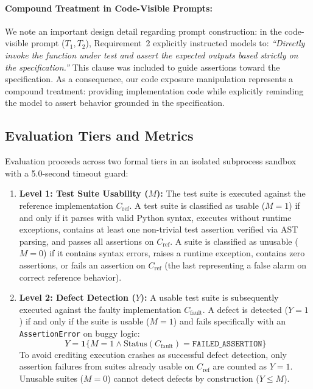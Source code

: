 \documentclass[11pt,a4paper]{article}
\begin{document}
\paragraph{Compound Treatment in Code-Visible Prompts:}
We note an important design detail regarding prompt construction: in the code-visible prompt ($T_1, T_2$), Requirement~2 explicitly instructed models to: \textit{``Directly invoke the function under test and assert the expected outputs based strictly on the specification.''} This clause was included to guide assertions toward the specification. As a consequence, our code exposure manipulation represents a compound treatment: providing implementation code while explicitly reminding the model to assert behavior grounded in the specification.

\subsection{Evaluation Tiers and Metrics}
Evaluation proceeds across two formal tiers in an isolated subprocess sandbox with a 5.0-second timeout guard:
\begin{enumerate}
    \item \textbf{Level 1: Test Suite Usability ($M$):} The test suite is executed against the reference implementation $C_{\text{ref}}$. A test suite is classified as usable ($M=1$) if and only if it parses with valid Python syntax, executes without runtime exceptions, contains at least one non-trivial test assertion verified via AST parsing, and passes all assertions on $C_{\text{ref}}$. A suite is classified as unusable ($M = 0$) if it contains syntax errors, raises a runtime exception, contains zero assertions, or fails an assertion on $C_{\text{ref}}$ (the last representing a false alarm on correct reference behavior).
    \item \textbf{Level 2: Defect Detection ($Y$):} A usable test suite is subsequently executed against the faulty implementation $C_{\text{fault}}$. A defect is detected ($Y=1$) if and only if the suite is usable ($M=1$) and fails specifically with an \texttt{AssertionError} on buggy logic:
    \begin{equation}
        Y = \mathbf{1}\{M=1 \land \text{Status}(C_{\text{fault}}) = \texttt{FAILED\_ASSERTION}\}
    \end{equation}
    To avoid crediting execution crashes as successful defect detection, only assertion failures from suites already usable on $C_{\text{ref}}$ are counted as $Y=1$. Unusable suites ($M=0$) cannot detect defects by construction ($Y \le M$).
\end{enumerate}
\end{document}
